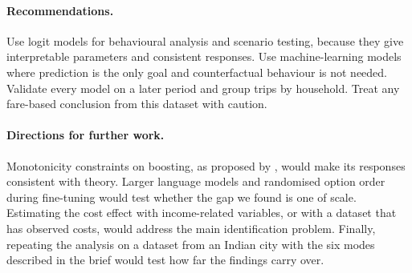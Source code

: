 \documentclass[11pt,a4paper]{article}
\begin{document}
\paragraph{Recommendations.}
Use logit models for behavioural analysis and scenario testing, because they give interpretable parameters and consistent responses. Use machine-learning models where prediction is the only goal and counterfactual behaviour is not needed. Validate every model on a later period and group trips by household. Treat any fare-based conclusion from this dataset with caution.

\paragraph{Directions for further work.}
Monotonicity constraints on boosting, as proposed by \citet{salvade2024}, would make its responses consistent with theory. Larger language models and randomised option order during fine-tuning would test whether the gap we found is one of scale. Estimating the cost effect with income-related variables, or with a dataset that has observed costs, would address the main identification problem. Finally, repeating the analysis on a dataset from an Indian city with the six modes described in the brief would test how far the findings carry over.
\end{document}
